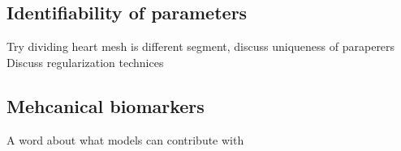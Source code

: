 \subsection{Identifiability of parameters}
Try dividing heart mesh is different segment, discuss uniqueness of
paraperers
Discuss regularization technices


\subsection{Mehcanical biomarkers}
A word about what models can contribute with




